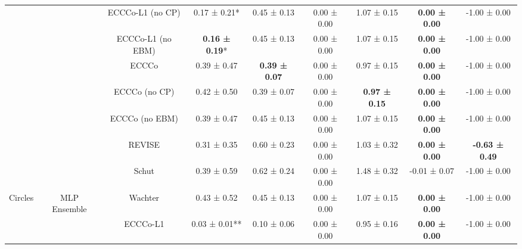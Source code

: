 \begin{longtable}[t]{ccccccccc}
 &  & ECCCo-L1 (no CP) & 0.17 ± 0.21*\hphantom{*} & 0.45 ± 0.13\hphantom{*}\hphantom{*} & 0.00 ± 0.00\hphantom{*}\hphantom{*} & 1.07 ± 0.15\hphantom{*}\hphantom{*} & \textbf{0.00 ± 0.00}\hphantom{*}\hphantom{*} & -1.00 ± 0.00\hphantom{*}\hphantom{*}\\

 &  & ECCCo-L1 (no EBM) & \textbf{0.16 ± 0.19}*\hphantom{*} & 0.45 ± 0.13\hphantom{*}\hphantom{*} & 0.00 ± 0.00\hphantom{*}\hphantom{*} & 1.07 ± 0.15\hphantom{*}\hphantom{*} & \textbf{0.00 ± 0.00}\hphantom{*}\hphantom{*} & -1.00 ± 0.00\hphantom{*}\hphantom{*}\\

 &  & ECCCo & 0.39 ± 0.47\hphantom{*}\hphantom{*} & \textbf{0.39 ± 0.07}\hphantom{*}\hphantom{*} & 0.00 ± 0.00\hphantom{*}\hphantom{*} & 0.97 ± 0.15\hphantom{*}\hphantom{*} & \textbf{0.00 ± 0.00}\hphantom{*}\hphantom{*} & -1.00 ± 0.00\hphantom{*}\hphantom{*}\\

 &  & ECCCo (no CP) & 0.42 ± 0.50\hphantom{*}\hphantom{*} & 0.39 ± 0.07\hphantom{*}\hphantom{*} & 0.00 ± 0.00\hphantom{*}\hphantom{*} & \textbf{0.97 ± 0.15}\hphantom{*}\hphantom{*} & \textbf{0.00 ± 0.00}\hphantom{*}\hphantom{*} & -1.00 ± 0.00\hphantom{*}\hphantom{*}\\

 &  & ECCCo (no EBM) & 0.39 ± 0.47\hphantom{*}\hphantom{*} & 0.45 ± 0.13\hphantom{*}\hphantom{*} & 0.00 ± 0.00\hphantom{*}\hphantom{*} & 1.07 ± 0.15\hphantom{*}\hphantom{*} & \textbf{0.00 ± 0.00}\hphantom{*}\hphantom{*} & -1.00 ± 0.00\hphantom{*}\hphantom{*}\\

 &  & REVISE & 0.31 ± 0.35\hphantom{*}\hphantom{*} & 0.60 ± 0.23\hphantom{*}\hphantom{*} & 0.00 ± 0.00\hphantom{*}\hphantom{*} & 1.03 ± 0.32\hphantom{*}\hphantom{*} & \textbf{0.00 ± 0.00}\hphantom{*}\hphantom{*} & \textbf{-0.63 ± 0.49}\hphantom{*}\hphantom{*}\\

 &  & Schut & 0.39 ± 0.59\hphantom{*}\hphantom{*} & 0.62 ± 0.24\hphantom{*}\hphantom{*} & 0.00 ± 0.00\hphantom{*}\hphantom{*} & 1.48 ± 0.32\hphantom{*}\hphantom{*} & -0.01 ± 0.07\hphantom{*}\hphantom{*} & -1.00 ± 0.00\hphantom{*}\hphantom{*}\\

\multirow[t]{-36}{*}{\centering\arraybackslash Circles} & \multirow[t]{-9}{*}{\centering\arraybackslash MLP Ensemble} & Wachter & 0.43 ± 0.52\hphantom{*}\hphantom{*} & 0.45 ± 0.13\hphantom{*}\hphantom{*} & 0.00 ± 0.00\hphantom{*}\hphantom{*} & 1.07 ± 0.15\hphantom{*}\hphantom{*} & \textbf{0.00 ± 0.00}\hphantom{*}\hphantom{*} & -1.00 ± 0.00\hphantom{*}\hphantom{*}\\
\cmidrule{1-9}
 &  & ECCCo-L1 & 0.03 ± 0.01** & 0.10 ± 0.06\hphantom{*}\hphantom{*} & 0.00 ± 0.00\hphantom{*}\hphantom{*} & 0.95 ± 0.16\hphantom{*}\hphantom{*} & \textbf{0.00 ± 0.00}\hphantom{*}\hphantom{*} & -1.00 ± 0.00\hphantom{*}\hphantom{*}\\


\end{longtable}
